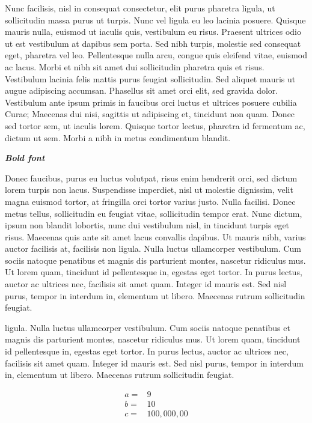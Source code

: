 Nunc facilisis, nisl in consequat consectetur, elit purus pharetra
ligula, ut sollicitudin massa purus ut turpis. Nunc vel ligula eu leo
lacinia posuere. Quisque mauris nulla, euismod ut iaculis quis,
vestibulum eu risus. Praesent ultrices odio ut est vestibulum at dapibus
sem porta. Sed nibh turpis, molestie sed consequat eget, pharetra vel
leo. Pellentesque nulla arcu, congue quis eleifend vitae, euismod ac
lacus. Morbi et nibh sit amet dui sollicitudin pharetra quis et risus.
Vestibulum lacinia felis mattis purus feugiat sollicitudin. Sed aliquet
mauris ut augue adipiscing accumsan. Phasellus sit amet orci elit, sed
gravida dolor. Vestibulum ante ipsum primis in faucibus orci luctus et
ultrices posuere cubilia Curae; Maecenas dui nisi, sagittis ut
adipiscing et, tincidunt non quam. Donec sed tortor sem, ut iaculis
lorem. Quisque tortor lectus, pharetra id fermentum ac, dictum ut sem.
Morbi a nibh in metus condimentum blandit.

\textbf{\emph{Bold font}}

Donec faucibus, purus eu luctus volutpat, risus enim hendrerit orci, sed
dictum lorem turpis non lacus. Suspendisse imperdiet, nisl ut molestie
dignissim, velit magna euismod tortor, at fringilla orci tortor varius
justo. Nulla facilisi. Donec metus tellus, sollicitudin eu feugiat
vitae, sollicitudin tempor erat. Nunc dictum, ipsum non blandit
lobortis, nunc dui vestibulum nisl, in tincidunt turpis eget risus.
Maecenas quis ante sit amet lacus convallis dapibus. Ut mauris nibh,
varius auctor facilisis at, facilisis non ligula. Nulla luctus
ullamcorper vestibulum. Cum sociis natoque penatibus et magnis dis
parturient montes, nascetur ridiculus mus. Ut lorem quam, tincidunt id
pellentesque in, egestas eget tortor. In purus lectus, auctor ac
ultrices nec, facilisis sit amet quam. Integer id mauris est. Sed nisl
purus, tempor in interdum in, elementum ut libero. Maecenas rutrum
sollicitudin feugiat.

ligula. Nulla luctus ullamcorper vestibulum. Cum sociis natoque
penatibus et magnis dis parturient montes, nascetur ridiculus mus. Ut
lorem quam, tincidunt id pellentesque in, egestas eget tortor. In purus
lectus, auctor ac ultrices nec, facilisis sit amet quam. Integer id
mauris est. Sed nisl purus, tempor in interdum in, elementum ut libero.
Maecenas rutrum sollicitudin feugiat.

\begin{align*}
a =& 9 \\
b =& 10 \\
c =& 100,000,00
\end{align*}

